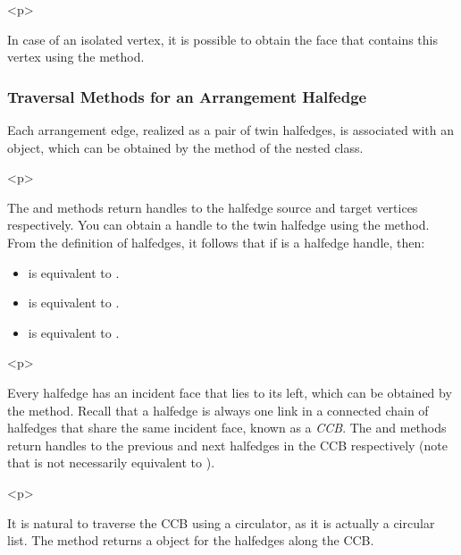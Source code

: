\begin{ccHtmlOnly}<p>\end{ccHtmlOnly}
In case of an isolated vertex, it is possible to obtain the face
that contains this vertex using the  method.

\subsubsection{Traversal Methods for an Arrangement Halfedge}
\label{arr_sssec:tr_halfedge}
%
Each arrangement edge, realized as a pair of twin halfedges,
is associated with an  object, which
can be obtained by the  method of the nested
 class.

\begin{ccHtmlOnly}<p>\end{ccHtmlOnly}
The  and  methods return handles to
the halfedge source and target vertices respectively. You can
obtain a handle to the twin halfedge using the 
method. From the definition of halfedges, it follows that if
 is a halfedge handle, then:
\begin{itemize}
\item {} is equivalent to .
\item {} is equivalent to .
\item {} is equivalent to .
\end{itemize}

\begin{ccHtmlOnly}<p>\end{ccHtmlOnly}
Every halfedge has an incident face that lies to its left, which
can be obtained by the  method. Recall that a
halfedge is always one link in a connected chain of halfedges that
share the same incident face, known as a {\em CCB}. The
 and  methods return handles to the
previous and next halfedges in the CCB respectively (note that
 is not necessarily equivalent to
).

\begin{ccHtmlOnly}<p>\end{ccHtmlOnly}
It is natural to traverse the CCB using a circulator, as it is
actually a circular list. The  method returns a 
 object for the
halfedges along the CCB.

